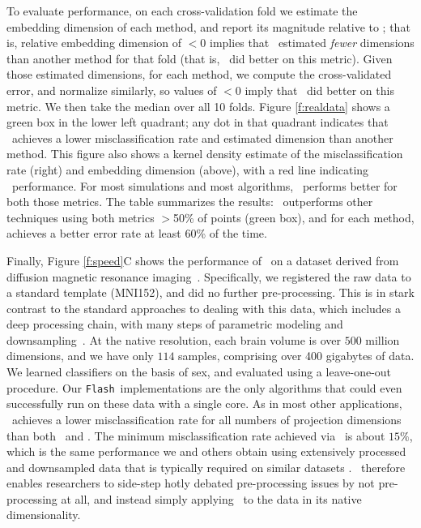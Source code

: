 \documentclass[11pt]{extarticle}
\begin{document}
To evaluate performance, on each cross-validation fold we estimate the embedding dimension of each method, and report its magnitude relative to \Lol; that is, relative embedding dimension of $<0$ implies that \Lol~estimated \emph{fewer} dimensions than another method for that fold (that is, \Lol~did better on this metric).  
Given those estimated dimensions, for each method, we compute the cross-validated error, and normalize similarly, so values of $<0$ imply that \Lol~did better on this metric.  
We then take the median over all 10 folds. Figure \ref{f:realdata} shows a green box in the lower left quadrant; any dot in that quadrant indicates that \Lol~achieves a lower misclassification rate and estimated dimension than another method.  
This figure also shows a kernel density estimate of the misclassification rate (right) and embedding dimension (above), with a red line indicating \Lol~performance. 
For most simulations and most algorithms, \Lol~performs better for both those metrics.
The table summarizes the results: \Lol~outperforms other techniques using both metrics $>$50\% of points (green box), and for each method,  achieves a better error rate at least  60\% of the time.



Finally, Figure \ref{f:speed}{\color{magenta}C} shows the performance of \Lol~on a dataset derived from diffusion magnetic resonance imaging~\cite{Kiar2018-bo}.  Specifically, we registered the raw data to a standard template (MNI152), and did no further pre-processing.  This  is in stark contrast to the standard approaches to dealing with this data, which includes a deep processing chain, with many steps of parametric modeling and downsampling~\cite{mrcap, migraine, sic}.  At the native resolution, each brain volume is over $500$ million dimensions, and we have only $114$  samples, comprising over 400 gigabytes of data.  We learned classifiers on the basis of sex, and evaluated using a leave-one-out procedure.
Our  \texttt{Flash}\Lol~implementations  are the only algorithms  that could even successfully run on these data with a single core.
As in most other applications, \Lol~achieves a lower misclassification rate for all numbers of projection dimensions than both \Pca~and \Lda.
The minimum misclassification rate achieved via \Lol~is about $15\%$, which is the same performance we and others obtain using  extensively processed and downsampled data that is typically required on similar datasets \cite{Vogelstein2013,Duarte-Carvajalino2011}.  
\Lol~therefore enables researchers to side-step hotly debated pre-processing issues by not pre-processing at all,  and instead simply applying \Lol~to the data in its native dimensionality.
\end{document}
